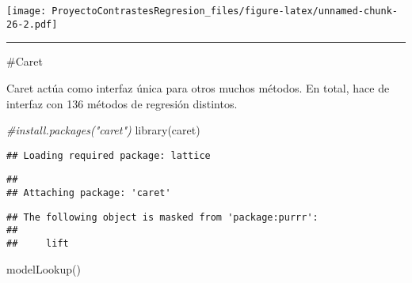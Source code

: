\documentclass[
]{article}
\newenvironment{Shaded}{\begin{snugshade}}{\end{snugshade}}
\newcommand{\CommentTok}[1]{\textcolor[rgb]{0.56,0.35,0.01}{\textit{#1}}}
\newcommand{\FunctionTok}[1]{\textcolor[rgb]{0.00,0.00,0.00}{#1}}
\newcommand{\NormalTok}[1]{#1}
\begin{document}
\texttt{[image: ProyectoContrastesRegresion\_files/figure-latex/unnamed-chunk-26-2.pdf]}

\begin{center}\rule{0.5\linewidth}{0.5pt}\end{center}

\#Caret

Caret actúa como interfaz única para otros muchos métodos. En total,
hace de interfaz con 136 métodos de regresión distintos.

\begin{Shaded}
\begin{Highlighting}[]
\CommentTok{\#install.packages("caret")}
\FunctionTok{library}\NormalTok{(caret)}
\end{Highlighting}
\end{Shaded}

\begin{verbatim}
## Loading required package: lattice
\end{verbatim}

\begin{verbatim}
## 
## Attaching package: 'caret'
\end{verbatim}

\begin{verbatim}
## The following object is masked from 'package:purrr':
## 
##     lift
\end{verbatim}

\begin{Shaded}
\begin{Highlighting}[]
\FunctionTok{modelLookup}\NormalTok{()}
\end{Highlighting}
\end{Shaded}
\end{document}
